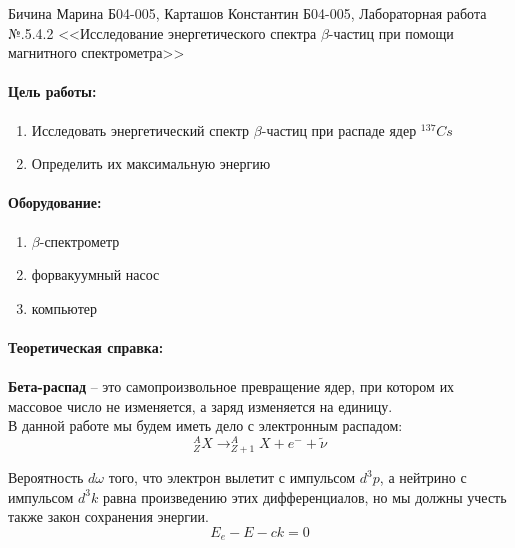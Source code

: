 \documentclass[a4paper,12pt]{article}
\author{Бичина Марина 
группа Б04-005 1 курса ФЭФМ}
\title{}
\date{}
\begin{document}

\begin{center}
\begin{Large}
{Бичина Марина Б04-005, Карташов Константин Б04-005, Лабораторная работа №.5.4.2 <<Исследование энергетического спектра $\beta$-частиц при помощи магнитного спектрометра>> }
\end{Large}
\end{center}
\paragraph{Цель работы:} 
\begin{enumerate}
\itemsep0em
\item Исследовать энергетический спектр $\beta$-частиц при распаде ядер $^{137}Cs$
\item Определить их максимальную энергию
\end{enumerate}
\paragraph{Оборудование:}
\begin{enumerate}
\itemsep0em
\item $\beta$-спектрометр
\item форвакуумный насос
\item компьютер
\end{enumerate}

\paragraph{Теоретическая справка:}
\paragraph{}
\textbf{Бета-распад} --  это самопроизвольное превращение ядер, при котором их массовое число не изменяется, а заряд изменяется на единицу. \\
 В данной работе мы будем иметь дело с электронным распадом:
		\begin{equation*}
		    _{Z}^{A}X \rightarrow _{Z+1}^{A}X + e^{-} + \widetilde{\nu}
		\end{equation*}

		Вероятность $d\omega$ того, что электрон вылетит с импульсом $d^3p$, а нейтрино с импульсом $d^3k$ равна произведению этих дифференциалов, но мы должны учесть также закон сохранения энергии.
		\begin{equation*}
		    E_e - E - ck = 0
		\end{equation*}
\end{document}
